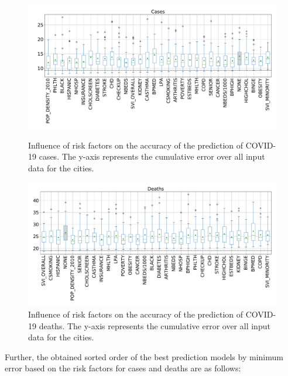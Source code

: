 \documentclass[a4paper, inpress]{jds} %
\renewcommand{\_}{%
    \textunderscore\hspace{0pt}%
}
\begin{document}
\begin{figure}[!p]
    \centering
    \includegraphics[width=1.0\textwidth]{images/boxwhisker/boxplot_casesNEW2.pdf}
    \vspace{-1cm}
    \caption{Influence of risk factors on the accuracy of the
      prediction of COVID-19 cases. The y-axis represents the
      cumulative error over all input data for the cities.}
    \label{fig:box-cases}
    \bigskip

    \includegraphics[width=1.0\textwidth]{images/boxwhisker/boxplot_deathNEW2.pdf}
    \vspace{-1cm}
    \caption{Influence of risk factors on the accuracy of the
      prediction of COVID-19 deaths. The y-axis represents the
      cumulative error over all input data for the cities.}
    \label{fig:box-death}
\end{figure}



Further, the obtained sorted order of the best prediction models by
minimum error based on the risk factors for cases and deaths are as
follows:
\end{document}
